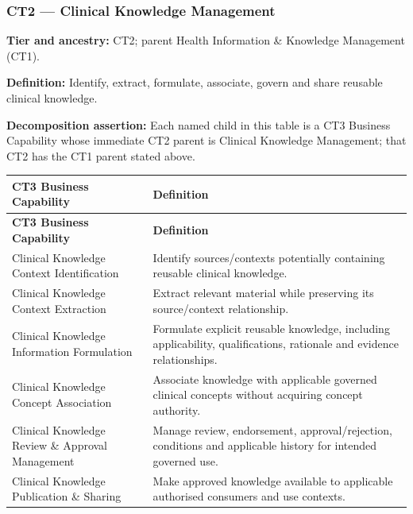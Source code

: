 \label{rad:business:664}
\subsubsection*{CT2 — Clinical Knowledge Management}
\label{rad:business:666}

\textbf{Tier and ancestry:} CT2; parent Health Information \& Knowledge Management (CT1).

\label{rad:business:668}

\textbf{Definition:} Identify, extract, formulate, associate, govern and share reusable clinical knowledge.

\label{rad:business:670}

\textbf{Decomposition assertion:} Each named child in this table is a CT3 Business Capability whose immediate CT2 parent is Clinical Knowledge Management; that CT2 has the CT1 parent stated above.

\label{rad:business:672}
\begingroup\small\setlength{\TableWidth}{\dimexpr\linewidth-4\tabcolsep-3\arrayrulewidth\relax}
\begin{longtable}{|>{\raggedright\arraybackslash}p{0.35\TableWidth}|>{\raggedright\arraybackslash}p{0.65\TableWidth}|}
\hline\rowcolor{TableHead}\textbf{CT3 Business Capability} & \textbf{Definition}\\\hline\endfirsthead
\hline\rowcolor{TableHead}\textbf{CT3 Business Capability} & \textbf{Definition}\\\hline\endhead
\hline\endfoot
Clinical Knowledge Context Identification & Identify sources/\allowbreak{}contexts potentially containing reusable clinical knowledge.\\\hline
Clinical Knowledge Context Extraction & Extract relevant material while preserving its source/\allowbreak{}context relationship.\\\hline
Clinical Knowledge Information Formulation & Formulate explicit reusable knowledge, including applicability, qualifications, rationale and evidence relationships.\\\hline
Clinical Knowledge Concept Association & Associate knowledge with applicable governed clinical concepts without acquiring concept authority.\\\hline
Clinical Knowledge Review \& Approval Management & Manage review, endorsement, approval/\allowbreak{}rejection, conditions and applicable history for intended governed use.\\\hline
Clinical Knowledge Publication \& Sharing & Make approved knowledge available to applicable authorised consumers and use contexts.\\\hline
\end{longtable}\endgroup
{}\label{rad:business:681}

